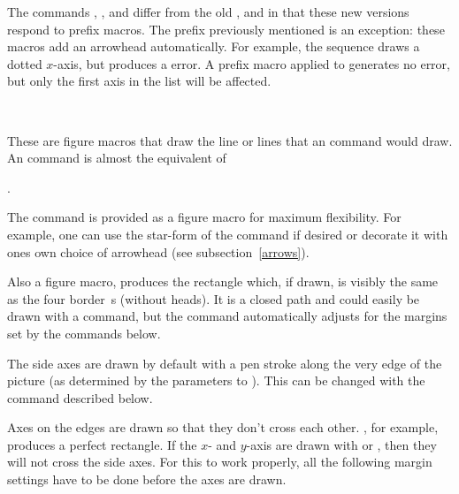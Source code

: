 \documentclass[letterpaper]{article}
\begin{document}
The commands , , and
 differ from the old ,  and
 in that these new versions respond to prefix macros. The
 prefix previously mentioned is an exception: these macros add
an arrowhead automatically. For example, the sequence
 draws a dotted $x$-axis, but
 produces a \MF{} error. A prefix macro applied to
 generates no error, but only the first axis in the list will
be affected.

\begin{cd}
\\
%
%
%
\end{cd}

These are figure macros that draw the line or lines that an 
command would draw. An  command is almost the equivalent of
\begin{display}
  .
\end{display}
The  command is provided as a figure macro for maximum
flexibility. For example, one can use the star-form of the 
command if desired or decorate it with ones own choice of arrowhead (see
subsection~\ref{arrows}).

Also a figure macro,  produces the rectangle which, if drawn,
is visibly the same as the four border \,s (without heads).
It is a closed path and could easily be drawn with a  command,
but the  command automatically adjusts for the margins set by
the commands below.

The side axes are drawn by default with a pen stroke along the very edge
of the picture (as determined by the parameters to ). This can
be changed with the command  described below.

Axes on the edges are drawn so that they don't cross each other.
, for example, produces a perfect rectangle. If the
$x$- and $y$-axis are drawn with  or , then they
will not cross the side axes. For this to work properly, all the
following margin settings have to be done before the axes are drawn.

\begin{cd}
\\
%
  \\
%
%
%
%
\end{cd}
\end{document}
